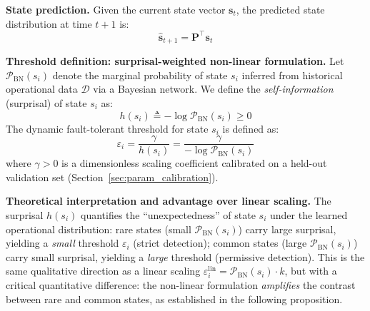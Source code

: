 \documentclass[manuscript,screen,review]{acmart}
\begin{document}
\textbf{State prediction.} Given the current state vector
$\mathbf{s}_t$, the predicted state distribution at time
$t+1$ is:
\begin{equation}
  \hat{\mathbf{s}}_{t+1} = \mathbf{P}^{\top} \mathbf{s}_t
  \label{eq:prediction}
\end{equation}

\textbf{Threshold definition: surprisal-weighted
non-linear formulation.}
Let $\mathcal{P}_{\mathrm{BN}}(s_i)$ denote
the marginal probability of state $s_i$ inferred from
historical operational data $\mathcal{D}$ via a Bayesian
network. We define the \emph{self-information} (surprisal)
of state $s_i$ as:
\begin{equation}
h(s_i) \triangleq -\log \mathcal{P}_{\mathrm{BN}}(s_i) \geq 0
\label{eq:surprisal}
\end{equation}
The dynamic fault-tolerant threshold for state $s_i$ is
defined as:
\begin{equation}
\varepsilon_i = \frac{\gamma}{h(s_i)}
             = \frac{\gamma}{-\log \mathcal{P}_{\mathrm{BN}}(s_i)}
\label{eq:threshold}
\end{equation}
where $\gamma > 0$ is a dimensionless scaling coefficient
calibrated on a held-out validation set
(Section~\ref{sec:param_calibration}).

\textbf{Theoretical interpretation and advantage over
linear scaling.}
The surprisal $h(s_i)$ quantifies the ``unexpectedness''
of state $s_i$ under the learned operational distribution:
rare states (small $\mathcal{P}_{\mathrm{BN}}(s_i)$)
carry large surprisal, yielding a \emph{small} threshold
$\varepsilon_i$ (strict detection); common states
(large $\mathcal{P}_{\mathrm{BN}}(s_i)$) carry small
surprisal, yielding a \emph{large} threshold
(permissive detection). This is the same qualitative
direction as a linear scaling
$\varepsilon_i^{\mathrm{lin}} = \mathcal{P}_{\mathrm{BN}}(s_i) \cdot k$,
but with a critical quantitative difference: the
non-linear formulation \emph{amplifies} the contrast
between rare and common states, as established in the
following proposition.
\end{document}
